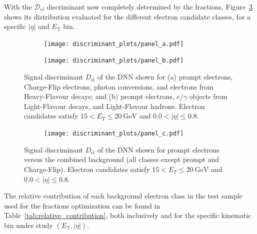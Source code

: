 With the $ \mathcal{D}_{el} $ discriminant now completely determined by the fractions, Figure~\ref{fig:dnn_final_disc_ab} shows its distribution evaluated for the different electron candidate classes, for a specific $|\eta|$ and $E_{\text{T}}$ bin.
\begin{figure}[htbp]
  \centering
  \begin{subfigure}[t]{0.48\linewidth}
    \centering
    \texttt{[image: discriminant\_plots/panel\_a.pdf]}
    \caption{}
    \label{fig:dnnDisc_a}
  \end{subfigure}\hfill
  \begin{subfigure}[t]{0.48\linewidth}
    \centering
    \texttt{[image: discriminant\_plots/panel\_b.pdf]}
    \caption{}
    \label{fig:dnnDisc_b}
  \end{subfigure}

  \caption{Signal discriminant $D_{\mathrm{el}}$ of the DNN shown for (a) prompt electrons,
  Charge-Flip electrons, photon conversions, and electrons from Heavy-Flavour decays; and
  (b) prompt electrons, $e/\gamma$ objects from Light-Flavour decays, and Light-Flavour hadrons.
  Electron candidates satisfy $15<E_{T}\leq 20~\mathrm{GeV}$ and $0.0<|\eta|\leq 0.8$.}
  \label{fig:dnn_final_disc_ab}
\end{figure}

\begin{figure}[htbp]
  \centering
  \begin{subfigure}[t]{0.60\linewidth}
    \centering
    \texttt{[image: discriminant\_plots/panel\_c.pdf]}
    \label{fig:dnnDisc_c}
  \end{subfigure}

  \caption{Signal discriminant $D_{\mathrm{el}}$ of the DNN shown for prompt electrons versus
  the combined background (all classes except prompt and Charge-Flip).
  Electron candidates satisfy $15<E_{T}\leq 20~\mathrm{GeV}$ and $0.0<|\eta|\leq 0.8$.}
  \label{fig:dnn_final_disc_c}
\end{figure}
The relative contribution of each background electron class in the test sample used for the fractions optimization can be found in Table~\ref{tab:relative_contribution}, both inclusively and for the specific kinematic bin under study $(E_{\text{T}},|\eta|)$.

